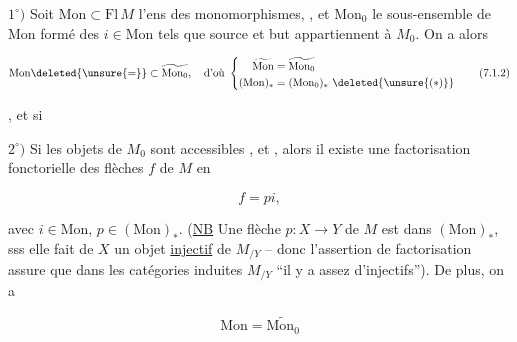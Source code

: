 $1^\circ)$ Soit $\mathrm{Mon}\subset\mathrm{Fl}\,M$ l'ens des monomorphismes, , et $\mathrm{Mon}_0$ le sous-ensemble de $\mathrm{Mon}$ formé des  $i\in\mathrm{Mon}$ tels que source et but appartiennent à  $M_0$. On a alors 


\[
\mathrm{Mon}\deleted{\unsure{=}}\subset\widetilde{\mathrm{Mon}_0},\quad \text{d'où }\left\{\begin{aligned}
\widetilde{\mathrm{Mon}}&=\widetilde{\mathrm{Mon}_0}\\
(\mathrm{Mon})_*&=(\mathrm{Mon}_0)_*\ \deleted{\unsure{(*)}}
\end{aligned}\right.\tag*{(7.1.2)}
\]


, et si 

\deleted{\[ \mathrm{Mon}=\widetilde{\mathrm{Mon}_0}\tag*{(7.1.3)}
\]}


$2^\circ)$ Si  les objets de $M_0$ sont accessibles , et , alors il existe une factorisation fonctorielle des  flèches $f$ de $M$ en

\[
f=pi,
\]

avec $i\in\mathrm{Mon}$, $p\in(\mathrm{Mon})_*$. (\uline{NB} Une flèche $p\colon X\longrightarrow Y$ de $M$ est dans $(\mathrm{Mon})_*$, sss elle fait de $X$ un objet \uline{injectif} de $M_{/Y}$ -- donc l'assertion de factorisation assure que dans les catégories induites $M_{/Y}$ ``il y a assez d'injectifs''). De plus,  on a

\[
\mathrm{Mon}=\widetilde{\mathrm{Mon}_0}\tag*{(7.1.3)}
\]

